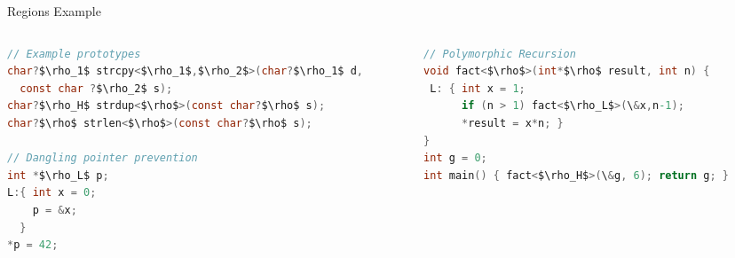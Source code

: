 \begin{frame}[fragile]{Regions Example}
\footnotesize{
  \begin{columns}[T]
    \begin{column}{0.48\textwidth}
\begin{lstlisting}[language=C,mathescape,basicstyle={\scriptsize\ttfamily}]
// Example prototypes
char?$\rho_1$ strcpy<$\rho_1$,$\rho_2$>(char?$\rho_1$ d,
  const char ?$\rho_2$ s);
char?$\rho_H$ strdup<$\rho$>(const char?$\rho$ s);
char?$\rho$ strlen<$\rho$>(const char?$\rho$ s);

// Dangling pointer prevention
int *$\rho_L$ p;
L:{ int x = 0;
    p = &x;
  }
*p = 42;
\end{lstlisting}
    \end{column}
%

    \begin{column}{0.48\textwidth}
\begin{lstlisting}[language=C,mathescape,basicstyle={\scriptsize\ttfamily}]
// Polymorphic Recursion
void fact<$\rho$>(int*$\rho$ result, int n) {
 L: { int x = 1;
      if (n > 1) fact<$\rho_L$>(\&x,n-1);
      *result = x*n; }
}
int g = 0;
int main() { fact<$\rho_H$>(\&g, 6); return g; }
\end{lstlisting}
    \end{column}
    \end{columns}
}
%
\end{frame}

